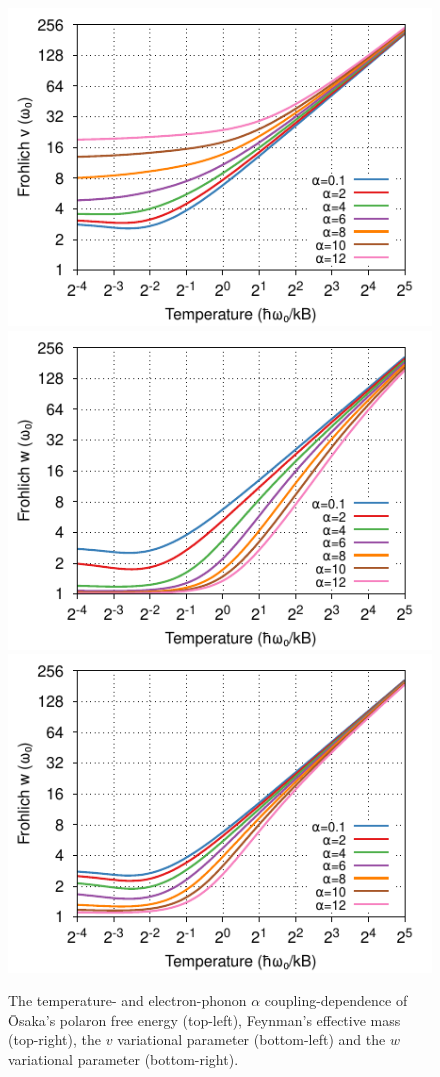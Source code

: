 \begin{figure}[hbt!]
    \includegraphics[width = .49\textwidth]{chapters/background/figures/frohlich-3d-v-temp-00625to32-COLOUR.pdf}
    \includegraphics[width = .49\textwidth]{chapters/background/figures/frohlich-2d-w-temp-00625to32-COLOUR.pdf}
    \includegraphics[width = .49\textwidth]{chapters/background/figures/frohlich-3d-w-temp-00625to32-COLOUR.pdf}
    \caption{The temperature- and electron-phonon $\alpha$ coupling-dependence of \=Osaka's polaron free energy (top-left), Feynman's effective mass (top-right), the $v$ variational parameter (bottom-left) and the $w$ variational parameter (bottom-right).}
    \label{fig-2252-1:thermaltheory}
\end{figure}
\FloatBarrier  

